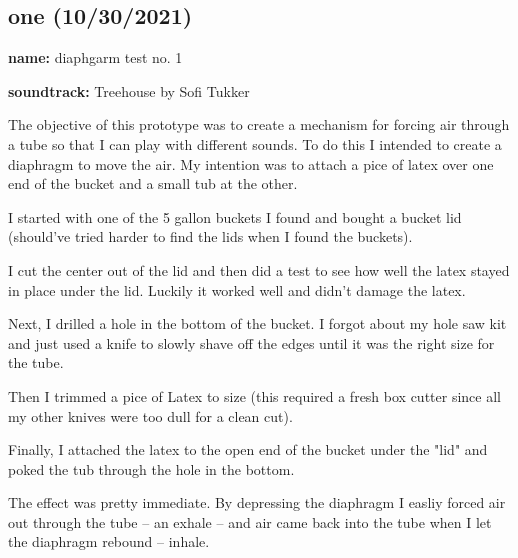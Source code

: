 \documentclass[11pt]{report}
\begin{document}
\begin{itmemize}
\subsection*{one (10/30/2021)}

\textbf{name:} diaphgarm test no. 1

\textbf{soundtrack:} Treehouse by Sofi Tukker

The objective of this prototype was to create a mechanism for forcing air through a tube so that I can play with different sounds. To do this I intended to create a diaphragm to move the air. My intention was to attach a pice of latex over one end of the bucket and a small tub at the other.

I started with one of the 5 gallon buckets I found and bought a bucket lid (should've tried harder to find the lids when I found the buckets).

I cut the center out of the lid and then did a test to see how well the latex stayed in place under the lid. Luckily it worked well and didn't damage the latex.

Next, I drilled a hole in the bottom of the bucket. I forgot about my hole saw kit and just used a knife to slowly shave off the edges until it was the right size for the tube.

Then I trimmed a pice of Latex to size (this required a fresh box cutter since all my other knives were too dull for a clean cut).

Finally, I attached the latex to the open end of the bucket under the "lid" and poked the tub through the hole in the bottom.

The effect was pretty immediate. By depressing the diaphragm I easliy forced air out through the tube -- an exhale -- and air came back into the tube when I let the diaphragm rebound -- inhale. 


\end{itmemize}
\end{document}
